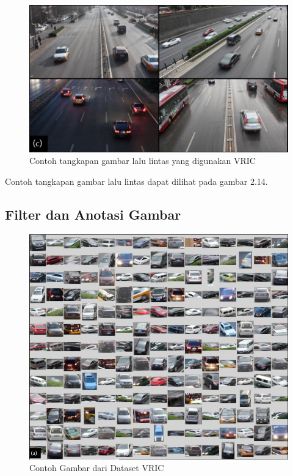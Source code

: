 \begin{figure}[ht]
  \centering
  \includegraphics[scale=1]{gambar/Contoh lalu lintas VRIC.png}
  \caption{Contoh tangkapan gambar lalu lintas yang digunakan VRIC}
  \label{fig:contohtangkapangambarlalulintasyangdigunakanvric}
\end{figure}

Contoh tangkapan gambar lalu lintas dapat dilihat pada gambar 2.14.\parencite{Kanaci2018}

\subsection{Filter dan Anotasi Gambar}

\begin{figure}[h]
  \centering
  \includegraphics[scale=0.6]{gambar/Contoh boundingbox VRIC.png}
  \caption{Contoh Gambar dari Dataset VRIC}
  \label{fig:contohgambardaridatasetvric}
\end{figure}

